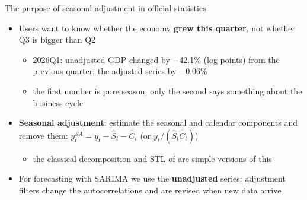 \begin{frame}{The purpose of seasonal adjustment in official statistics}
\itemsize{\small}
\begin{itemize}
    \item Users want to know whether the economy \textbf{grew this quarter}, not whether Q3 is bigger than Q2
    \begin{itemize}
        \item 2026Q1: unadjusted GDP changed by \ensuremath{-}42.1\% (log points) from the previous quarter; the adjusted series by \ensuremath{-}0.06\%
        \item the first number is pure season; only the second says something about the business cycle
    \end{itemize}
    \item \textbf{Seasonal adjustment}: estimate the seasonal and calendar components and remove them: $y_t^{SA} = y_t - \hat S_t - \hat C_t$ (or $y_t/(\hat S_t\hat C_t)$)
    \begin{itemize}
        \item the classical decomposition and STL of  are simple versions of this
    \end{itemize}
    \item For forecasting with SARIMA we use the \textbf{unadjusted} series: adjustment filters change the autocorrelations and are revised when new data arrive
\end{itemize}
\end{frame}

